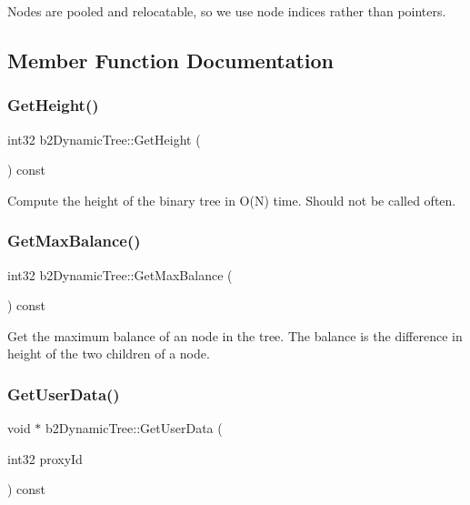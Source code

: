 Nodes are pooled and relocatable, so we use node indices rather than pointers. 

\subsection{Member Function Documentation}
\mbox{\label{classb2DynamicTree_ae3c7dc771d596f1f95fd3a3d7f2f3e97}} 
\subsubsection{\texorpdfstring{Get\+Height()}{GetHeight()}}
{\footnotesize\ttfamily int32 b2\+Dynamic\+Tree\+::\+Get\+Height (\begin{DoxyParamCaption}{ }\end{DoxyParamCaption}) const}

Compute the height of the binary tree in O(\+N) time. Should not be called often. \mbox{\label{classb2DynamicTree_a3feab170229e0acd17f6a4ad3fca406e}} 
\subsubsection{\texorpdfstring{Get\+Max\+Balance()}{GetMaxBalance()}}
{\footnotesize\ttfamily int32 b2\+Dynamic\+Tree\+::\+Get\+Max\+Balance (\begin{DoxyParamCaption}{ }\end{DoxyParamCaption}) const}

Get the maximum balance of an node in the tree. The balance is the difference in height of the two children of a node. \mbox{\label{classb2DynamicTree_aa8399f9440707780f267696098e8b920}} 
\subsubsection{\texorpdfstring{Get\+User\+Data()}{GetUserData()}}
{\footnotesize\ttfamily void $\ast$ b2\+Dynamic\+Tree\+::\+Get\+User\+Data (\begin{DoxyParamCaption}\item[{int32}]{proxy\+Id }\end{DoxyParamCaption}) const\hspace{0.3cm}{\ttfamily [inline]}}


